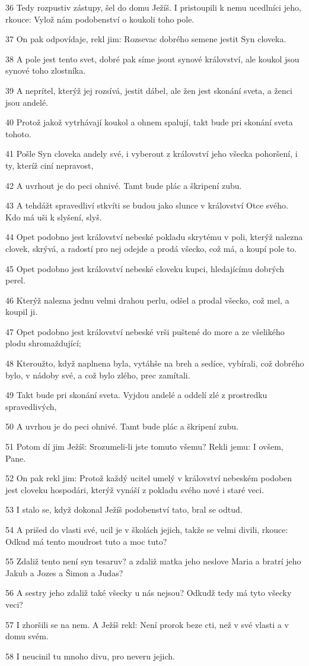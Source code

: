 \par 36 Tedy rozpustiv zástupy, šel do domu Ježíš. I pristoupili k nemu ucedlníci jeho, rkouce: Vylož nám podobenství o koukoli toho pole.
\par 37 On pak odpovídaje, rekl jim: Rozsevac dobrého semene jestit Syn cloveka.
\par 38 A pole jest tento svet, dobré pak síme jsout synové království, ale koukol jsou synové toho zlostníka.
\par 39 A neprítel, kterýž jej rozsívá, jestit dábel, ale žen jest skonání sveta, a ženci jsou andelé.
\par 40 Protož jakož vytrhávají koukol a ohnem spalují, takt bude pri skonání sveta tohoto.
\par 41 Pošle Syn cloveka andely své, i vyberout z království jeho všecka pohoršení, i ty, kteríž ciní nepravost,
\par 42 A uvrhout je do peci ohnivé. Tamt bude plác a škripení zubu.
\par 43 A tehdážt spravedliví stkvíti se budou jako slunce v království Otce svého. Kdo má uši k slyšení, slyš.
\par 44 Opet podobno jest království nebeské pokladu skrytému v poli, kterýž nalezna clovek, skrývá, a radostí pro nej odejde a prodá všecko, což má, a koupí pole to.
\par 45 Opet podobno jest království nebeské cloveku kupci, hledajícímu dobrých perel.
\par 46 Kterýž nalezna jednu velmi drahou perlu, odšel a prodal všecko, což mel, a koupil ji.
\par 47 Opet podobno jest království nebeské vrši puštené do more a ze všelikého plodu shromaždující;
\par 48 Kteroužto, když naplnena byla, vytáhše na breh a sedíce, vybírali, což dobrého bylo, v nádoby své, a což bylo zlého, prec zamítali.
\par 49 Takt bude pri skonání sveta. Vyjdou andelé a oddelí zlé z prostredku spravedlivých,
\par 50 A uvrhou je do peci ohnivé. Tamt bude plác a škripení zubu.
\par 51 Potom dí jim Ježíš: Srozumeli-li jste tomuto všemu? Rekli jemu: I ovšem, Pane.
\par 52 On pak rekl jim: Protož každý ucitel umelý v království nebeském podoben jest cloveku hospodári, kterýž vynáší z pokladu svého nové i staré veci.
\par 53 I stalo se, když dokonal Ježíš podobenství tato, bral se odtud.
\par 54 A prišed do vlasti své, ucil je v školách jejich, takže se velmi divili, rkouce: Odkud má tento moudrost tuto a moc tuto?
\par 55 Zdaliž tento není syn tesaruv? a zdaliž matka jeho neslove Maria a bratrí jeho Jakub a Jozes a Šimon a Judas?
\par 56 A sestry jeho zdaliž také všecky u nás nejsou? Odkudž tedy má tyto všecky veci?
\par 57 I zhoršili se na nem. A Ježíš rekl: Není prorok beze cti, než v své vlasti a v domu svém.
\par 58 I neucinil tu mnoho divu, pro neveru jejich.

